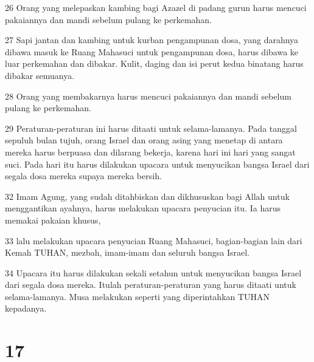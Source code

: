 \par 26 Orang yang melepaskan kambing bagi Azazel di padang gurun harus mencuci pakaiannya dan mandi sebelum pulang ke perkemahan.
\par 27 Sapi jantan dan kambing untuk kurban pengampunan dosa, yang darahnya dibawa masuk ke Ruang Mahasuci untuk pengampunan dosa, harus dibawa ke luar perkemahan dan dibakar. Kulit, daging dan isi perut kedua binatang harus dibakar semuanya.
\par 28 Orang yang membakarnya harus mencuci pakaiannya dan mandi sebelum pulang ke perkemahan.
\par 29 Peraturan-peraturan ini harus ditaati untuk selama-lamanya. Pada tanggal sepuluh bulan tujuh, orang Israel dan orang asing yang menetap di antara mereka harus berpuasa dan dilarang bekerja, karena hari ini hari yang sangat suci. Pada hari itu harus dilakukan upacara untuk menyucikan bangsa Israel dari segala dosa mereka supaya mereka bersih.
\par 32 Imam Agung, yang sudah ditahbiskan dan dikhususkan bagi Allah untuk menggantikan ayahnya, harus melakukan upacara penyucian itu. Ia harus memakai pakaian khusus,
\par 33 lalu melakukan upacara penyucian Ruang Mahasuci, bagian-bagian lain dari Kemah TUHAN, mezbah, imam-imam dan seluruh bangsa Israel.
\par 34 Upacara itu harus dilakukan sekali setahun untuk menyucikan bangsa Israel dari segala dosa mereka. Itulah peraturan-peraturan yang harus ditaati untuk selama-lamanya. Musa melakukan seperti yang diperintahkan TUHAN kepadanya.

\chapter{17}

